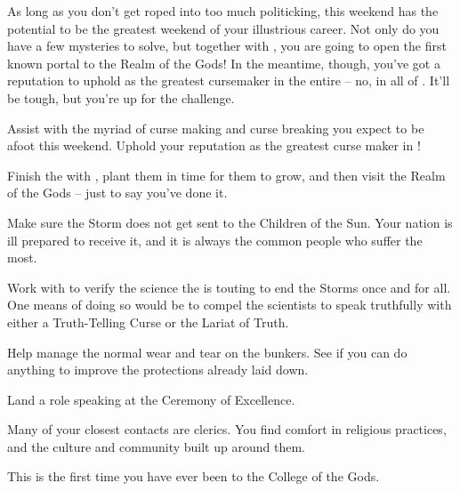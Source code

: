 \documentclass[char]{GL2020}
\begin{document}
As long as you don't get roped into too much politicking, this weekend has the potential to be the greatest weekend of your illustrious career. Not only do you have a few mysteries to solve, but together with \cFlowPriest{}, you are going to open the first known portal to the Realm of the Gods! In the meantime, though, you've got a reputation to uphold as the greatest cursemaker in the entire \pFarm{} -- no, in all of \pEarth{}. It'll be tough, but you're up for the challenge.

\begin{itemz}
	\item Assist with the myriad of curse making and curse breaking you expect to be afoot this weekend. Uphold your reputation as the greatest curse maker in \pEarth{}!
	\item Finish the \iBeansNB{} with \cFlowPriest{}, plant them in time for them to grow, and then visit the Realm of the Gods -- just to say you've done it.
	\item Make sure the Storm does not get sent to the Children of the Sun. Your nation is ill prepared to receive it, and it is always the common people who suffer the most.
	\item Work with \cHedonist{} to verify the science the \pTech{} is touting to end the Storms once and for all. One means of doing so would be to compel the scientists to speak truthfully with either a Truth-Telling Curse or the Lariat of Truth.
	\item Help \cBunker{} manage the normal wear and tear on the bunkers. See if you can do anything to improve the protections already laid down.
	\item Land a role speaking at the Ceremony of Excellence.
\end{itemz}

\begin{itemz}[Notes]
	\item Many of your closest contacts are clerics. You find comfort in religious practices, and the culture and community built up around them.
	\item This is the first time you have ever been to the College of the Gods.
\end{itemz}
\end{document}
